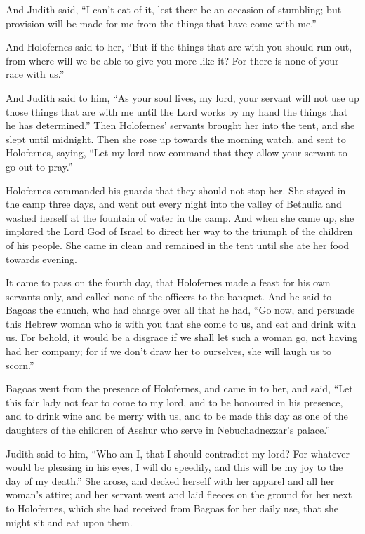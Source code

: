  And Judith said, ``I can't eat of it, lest there be an
occasion of stumbling; but provision will be made for me from the things
that have come with me.''

 And Holofernes said to her, ``But if the things that are
with you should run out, from where will we be able to give you more
like it? For there is none of your race with us.''

 And Judith said to him, ``As your soul lives, my lord, your
servant will not use up those things that are with me until the Lord
works by my hand the things that he has determined.''  Then
Holofernes' servants brought her into the tent, and she slept until
midnight. Then she rose up towards the morning watch,  and
sent to Holofernes, saying, ``Let my lord now command that they allow
your servant to go out to pray.''

 Holofernes commanded his guards that they should not stop
her. She stayed in the camp three days, and went out every night into
the valley of Bethulia and washed herself at the fountain of water in
the camp.  And when she came up, she implored the Lord God
of Israel to direct her way to the triumph of the children of his
people.  She came in clean and remained in the tent until
she ate her food towards evening.

 It came to pass on the fourth day, that Holofernes made a
feast for his own servants only, and called none of the officers to the
banquet.  And he said to Bagoas the eunuch, who had charge
over all that he had, ``Go now, and persuade this Hebrew woman who is
with you that she come to us, and eat and drink with us. 
For behold, it would be a disgrace if we shall let such a woman go, not
having had her company; for if we don't draw her to ourselves, she will
laugh us to scorn.''

 Bagoas went from the presence of Holofernes, and came in
to her, and said, ``Let this fair lady not fear to come to my lord, and
to be honoured in his presence, and to drink wine and be merry with us,
and to be made this day as one of the daughters of the children of
Asshur who serve in Nebuchadnezzar's palace.''

 Judith said to him, ``Who am I, that I should contradict
my lord? For whatever would be pleasing in his eyes, I will do speedily,
and this will be my joy to the day of my death.''  She
arose, and decked herself with her apparel and all her woman's attire;
and her servant went and laid fleeces on the ground for her next to
Holofernes, which she had received from Bagoas for her daily use, that
she might sit and eat upon them.

